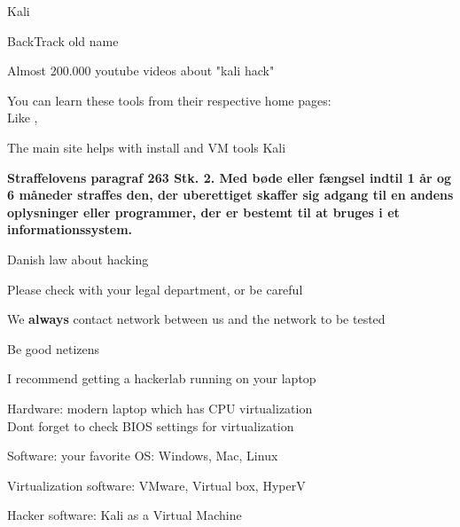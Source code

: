 \documentclass[Screen16to9,17pt]{foils}
\begin{document}


\begin{list1}
\item Kali 
\item BackTrack  old name
\end{list1}



\begin{list1}
\item Almost 200.000 youtube videos about "kali hack"
\item You can learn these tools from their respective home pages:\\
Like , 
\item The main site helps with install and VM tools Kali 
\end{list1}


{\bfseries Straffelovens paragraf 263 Stk. 2. Med bøde eller fængsel indtil 1 år og 6 måneder straffes den, der uberettiget skaffer sig adgang til en andens oplysninger eller programmer, der er bestemt til at bruges i et informationssystem. }

\begin{list2}
\item Danish law about hacking
\item Please check with your legal department, or be careful
\item We {\bf always} contact network between us and the network to be tested
\item Be good netizens
\end{list2}



\begin{list2}
\item I recommend getting a hackerlab running on your laptop
\item Hardware: modern laptop which has CPU virtualization\\
Dont forget to check BIOS settings for virtualization
\item Software: your favorite OS: Windows, Mac, Linux
\item Virtualization software: VMware, Virtual box, HyperV
\item Hacker software: Kali as a Virtual Machine 
\end{list2}
\end{document}
